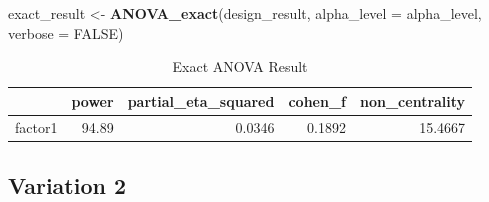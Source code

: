\documentclass[]{book}
\newenvironment{Shaded}{\begin{snugshade}}{\end{snugshade}}
\newcommand{\DataTypeTok}[1]{\textcolor[rgb]{0.13,0.29,0.53}{#1}}
\newcommand{\KeywordTok}[1]{\textcolor[rgb]{0.13,0.29,0.53}{\textbf{#1}}}
\newcommand{\NormalTok}[1]{#1}
\newcommand{\OtherTok}[1]{\textcolor[rgb]{0.56,0.35,0.01}{#1}}
\newcommand{\StringTok}[1]{\textcolor[rgb]{0.31,0.60,0.02}{#1}}
\begin{document}
\begin{Shaded}
\begin{Highlighting}[]
\NormalTok{exact_result <-}\StringTok{ }\KeywordTok{ANOVA_exact}\NormalTok{(design_result,}
                            \DataTypeTok{alpha_level =}\NormalTok{ alpha_level,}
                            \DataTypeTok{verbose =} \OtherTok{FALSE}\NormalTok{)}
\end{Highlighting}
\end{Shaded}

\begin{table}[t]

\caption{\label{tab:unnamed-chunk-51}Exact ANOVA Result}
\centering
\begin{tabular}{l|r|r|r|r}
\hline
  & power & partial\_eta\_squared & cohen\_f & non\_centrality\\
\hline
factor1 & 94.89 & 0.0346 & 0.1892 & 15.4667\\
\hline
\end{tabular}
\end{table}

\hypertarget{variation-2}{%
\subsection{Variation 2}\label{variation-2}}
\end{document}
